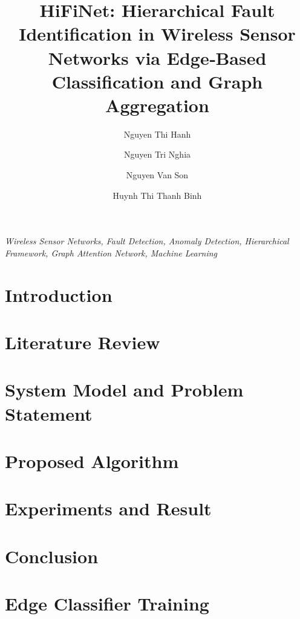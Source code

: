 \documentclass[preprint,12pt]{elsarticle}
\begin{document}
\begin{frontmatter}

\title{HiFiNet: Hierarchical Fault Identification in Wireless Sensor Networks via Edge‑Based Classification and Graph Aggregation}

\author[fidt:pnk]{Nguyen Thi Hanh}
\author[hust]{Nguyen Tri Nghia}
\author[fcs:pnk]{Nguyen Van Son}
\author[hust]{Huynh Thi Thanh Binh}
\address[fidt:pnk]{Faculty of Interdisciplinary Digital Technology (FIDT), PHENIKAA University, Vietnam}
\address[hust]{Hanoi University of Science and Technology, Vietnam}
\address[fcs:pnk]{Faculty of Computer Science, PHENIKAA University, Yen Nghia, Ha Dong, Hanoi 12116, Vietnam}



\begin{keyword}
\textit{Wireless Sensor Networks, Fault Detection, Anomaly Detection, Hierarchical Framework, Graph Attention Network, Machine Learning}
\end{keyword}

\end{frontmatter}

\section{Introduction}


\section{Literature Review}


\section{System Model and Problem Statement}


\section{Proposed Algorithm}
\label{sec:method}


\section{Experiments and Result}


\section{Conclusion}


\clearpage


\clearpage
\appendix
\section{Edge Classifier Training}
\label{app:edge_training}

\end{document}
